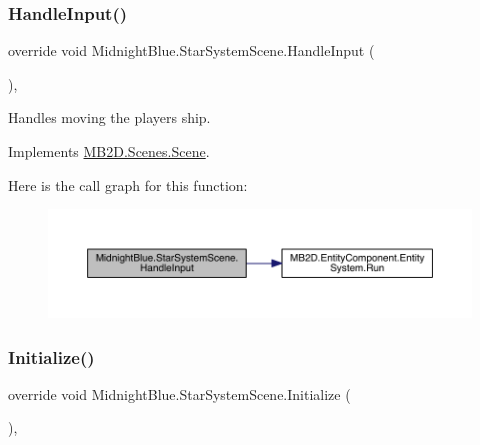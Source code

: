 \subsubsection{\texorpdfstring{Handle\+Input()}{HandleInput()}}
{\footnotesize\ttfamily override void Midnight\+Blue.\+Star\+System\+Scene.\+Handle\+Input (\begin{DoxyParamCaption}{ }\end{DoxyParamCaption})\hspace{0.3cm}{\ttfamily [inline]}, {\ttfamily [virtual]}}



Handles moving the players ship. 



Implements \hyperlink{class_m_b2_d_1_1_scenes_1_1_scene_a476de5a885408d27ff151044d20738c8}{M\+B2\+D.\+Scenes.\+Scene}.

Here is the call graph for this function\+:\nopagebreak
\begin{figure}[H]
\begin{center}
\leavevmode
\includegraphics[width=350pt]{class_midnight_blue_1_1_star_system_scene_a9fd64901322082a4da8658650257163d_cgraph}
\end{center}
\end{figure}
\hypertarget{class_midnight_blue_1_1_star_system_scene_a1b593cd45d0f1b6c02f17ec5dd1033ca}{}\label{class_midnight_blue_1_1_star_system_scene_a1b593cd45d0f1b6c02f17ec5dd1033ca} 
\subsubsection{\texorpdfstring{Initialize()}{Initialize()}}
{\footnotesize\ttfamily override void Midnight\+Blue.\+Star\+System\+Scene.\+Initialize (\begin{DoxyParamCaption}{ }\end{DoxyParamCaption})\hspace{0.3cm}{\ttfamily [inline]}, {\ttfamily [virtual]}}



